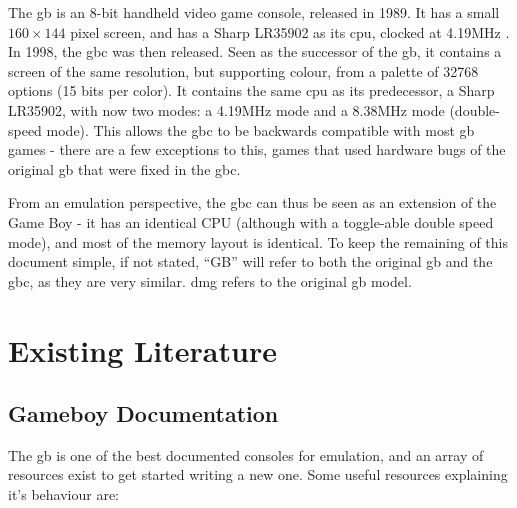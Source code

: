 \documentclass[11pt]{report}
\begin{document}
The \gls{gb} is an 8-bit handheld video game console, released in 1989. It has a small $160 \times 144$ pixel screen, and has a Sharp LR35902 as its \gls{cpu}, clocked at 4.19MHz \cite[Specifications]{pandoc}. In 1998, the \gls{gbc} was then released. Seen as the successor of the \gls{gb}, it contains a screen of the same resolution, but supporting colour, from a palette of 32768 options (15 bits per color). It contains the same \gls{cpu} as its predecessor, a Sharp LR35902, with now two modes: a 4.19MHz mode and a 8.38MHz mode (double-speed mode). This allows the \gls{gbc} to be backwards compatible with most \gls{gb} games - there are a few exceptions to this, games that used hardware bugs of the original \gls{gb} that were fixed in the \gls{gbc}.

From an emulation perspective, the \glsdesc{gbc} can thus be seen as an extension of the Game Boy - it has an identical CPU (although with a toggle-able double speed mode), and most of the memory layout is identical. To keep the remaining of this document simple, if not stated, ``GB'' will refer to both the original \glsdesc{gb} and the \glsdesc{gbc}, as they are very similar. \gls{dmg} refers to the original \glsdesc{gb} model.

\section{Existing Literature}

\subsection{Gameboy Documentation}

The \glsdesc{gb} is one of the best documented consoles for emulation, and an array of resources exist to get started writing a new one. Some useful resources explaining it's behaviour are:
\end{document}
